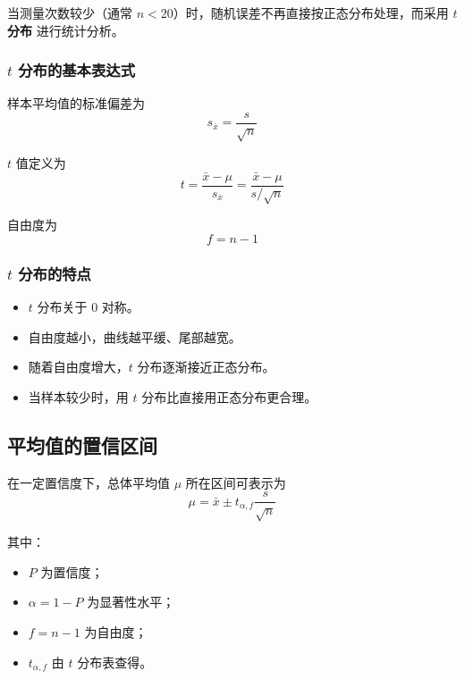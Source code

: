 \documentclass[12pt,a4paper]{article}
\numberwithin{equation}{section}
\begin{document}
当测量次数较少（通常 $n<20$）时，随机误差不再直接按正态分布处理，而采用 \textbf{$t$ 分布} 进行统计分析。

\subsubsection{$t$ 分布的基本表达式}

样本平均值的标准偏差为
\begin{equation}
s_{\bar{x}}=\frac{s}{\sqrt{n}}
\end{equation}

$t$ 值定义为
\begin{equation}
t=\frac{\bar{x}-\mu}{s_{\bar{x}}}
=\frac{\bar{x}-\mu}{s/\sqrt{n}}
\end{equation}

自由度为
\begin{equation}
f=n-1
\end{equation}

\subsubsection{$t$ 分布的特点}

\begin{itemize}
    \item $t$ 分布关于 $0$ 对称。
    \item 自由度越小，曲线越平缓、尾部越宽。
    \item 随着自由度增大，$t$ 分布逐渐接近正态分布。
    \item 当样本较少时，用 $t$ 分布比直接用正态分布更合理。
\end{itemize}

\subsection{平均值的置信区间}

在一定置信度下，总体平均值 $\mu$ 所在区间可表示为
\begin{equation}
\mu=\bar{x}\pm t_{\alpha,f}\frac{s}{\sqrt{n}}
\end{equation}

其中：
\begin{itemize}
    \item $P$ 为置信度；
    \item $\alpha=1-P$ 为显著性水平；
    \item $f=n-1$ 为自由度；
    \item $t_{\alpha,f}$ 由 $t$ 分布表查得。
\end{itemize}
\end{document}
